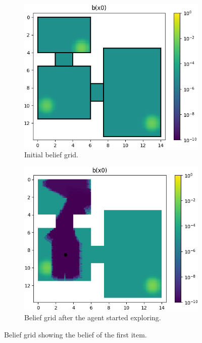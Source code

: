 \begin{figure}
    \centering
    \begin{subfigure}[t]{0.48\textwidth}
        \includegraphics[width=\textwidth]{Report/images/belief_sc03.png}
        \caption{Initial belief grid.}
        \label{subfig:b_sc03}
    \end{subfigure}
    \hfill
    \begin{subfigure}[t]{0.48\textwidth}
        \includegraphics[width=\textwidth]{Report/images/belief_sc03_observed.png}
        \caption{Belief grid after the agent started exploring.}
        \label{subfig:b_sc03_observed}
    \end{subfigure}
    \caption{Belief grid showing the belief of the first item.}
    \label{fig:belief_grid}
\end{figure}
%
